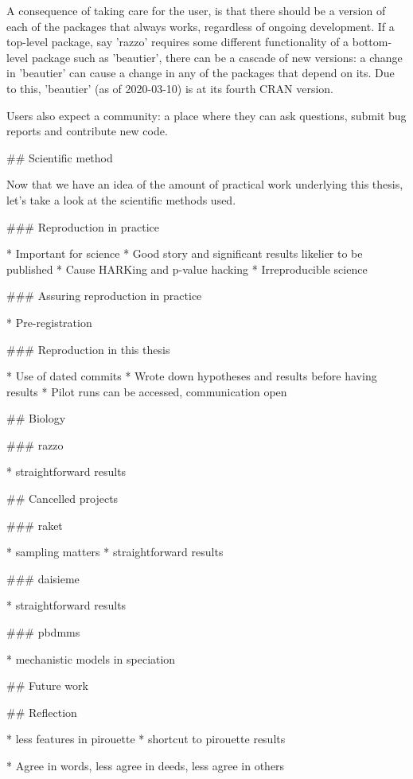 A consequence of taking care for the user, is that there should be
a version of each of the packages that always works, regardless of ongoing
development. If a top-level package, say 'razzo' requires some different 
functionality of a bottom-level package such as 'beautier', there
can be a cascade of new versions: a change in 'beautier' 
can cause a change in any of the packages that depend on its.
Due to this, 'beautier' (as of 2020-03-10) is at its fourth CRAN version.

Users also expect a community: a place where they can ask questions,
submit bug reports and contribute new code. 



## Scientific method

Now that we have an idea of the amount of practical work underlying
this thesis, let's take a look at the scientific methods used.

### Reproduction in practice

 * Important for science
 * Good story and significant results likelier to be published
 * Cause HARKing and p-value hacking
 * Irreproducible science

### Assuring reproduction in practice

 * Pre-registration

### Reproduction in this thesis

 * Use of dated commits
 * Wrote down hypotheses and results before having results
 * Pilot runs can be accessed, communication open

## Biology

### razzo

 * straightforward results

## Cancelled projects

### raket

 * sampling matters
 * straightforward results

### daisieme

 * straightforward results

### pbdmms

 * mechanistic models in speciation

## Future work

## Reflection

 * less features in pirouette
 * shortcut to pirouette results



 * Agree in words, less agree in deeds, less agree in others \cite{anderson2007normative}



